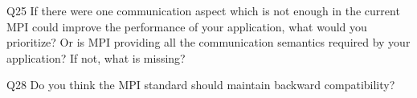 \begin{description}%
\item{Q25} If there were one communication aspect which is not enough in the current MPI could improve the performance of your application, what would you prioritize? Or is MPI providing all the communication semantics required by your application? If not, what is missing?%
\item{Q28} Do you think the MPI standard should maintain backward compatibility?%
\end{description}%

